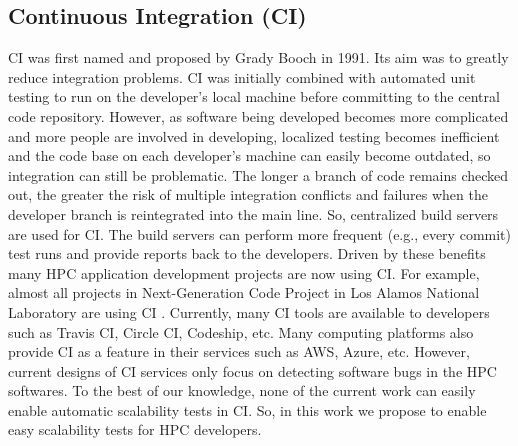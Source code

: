 \subsection{Continuous Integration (CI)}
CI was first named and proposed by Grady Booch in 1991. Its aim was to greatly reduce integration problems. CI was initially combined with automated unit testing to run on the developer's local machine before committing to the central code repository.  However, as software being developed becomes more complicated and more people are involved in developing, localized testing becomes inefficient and the code base on each developer's machine can easily become outdated, so integration can still be problematic. The longer a branch of code remains checked out, the greater the risk of multiple integration conflicts and failures when the developer branch is reintegrated into the main line. So, centralized build servers are used for CI. The build servers can perform more frequent (e.g., every commit) test runs and provide reports back to the developers. Driven by these benefits many HPC application development projects are now using CI. For example, almost all projects in Next-Generation Code Project in Los Alamos National Laboratory are using CI \cite{daniel2016lanl}. Currently, many CI tools are available to developers such as Travis CI, Circle CI, Codeship, etc. Many computing platforms also provide CI as a feature in their services such as AWS, Azure, etc. However, current designs of CI services only focus on detecting software bugs in the HPC softwares. To the best of our knowledge, none of the current work can easily enable automatic scalability tests in CI. So, in this work we propose to enable easy scalability tests for HPC developers. %

